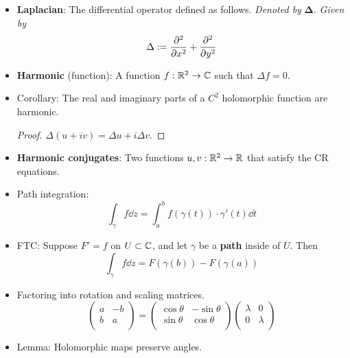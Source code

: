 \documentclass[../notes.tex]{subfiles}
\begin{document}
\begin{itemize}
\begin{equation*}
    \end{equation*}
    \item \textbf{Laplacian}: The differential operator defined as follows. \emph{Denoted by} $\bm{\Delta}$. \emph{Given by}
    \begin{equation*}
        \Delta := \pdv[2]{x}+\pdv[2]{y}
    \end{equation*}
    \item \textbf{Harmonic} (function): A function $f:\mathbb{R}^2\to\mathbb{C}$ such that $\Delta f=0$.
    \item Corollary: The real and imaginary parts of a $C^2$ holomorphic function are harmonic.
    \begin{proof}
        $\Delta(u+iv)=\Delta u+i\Delta v$.
    \end{proof}
    \item \textbf{Harmonic conjugates}: Two functions $u,v:\mathbb{R}^2\to\mathbb{R}$ that satisfy the CR equations.
    \item Path integration:
    \begin{equation*}
        \int_\gamma f\dd{z} = \int_a^bf(\gamma(t))\cdot\gamma'(t)\dd{t}
    \end{equation*}
    \item FTC: Suppose $F'=f$ on $U\subset\mathbb{C}$, and let $\gamma$ be a \textbf{path} inside of $U$. Then
    \begin{equation*}
        \int_\gamma f\dd{z} = F(\gamma(b))-F(\gamma(a))
    \end{equation*}
    \item Factoring into rotation and scaling matrices.
    \begin{equation*}
        \begin{pmatrix}
            a & -b\\
            b & a\\
        \end{pmatrix}
        =
        \begin{pmatrix}
            \cos\theta & -\sin\theta\\
            \sin\theta & \cos\theta\\
        \end{pmatrix}
        \begin{pmatrix}
            \lambda & 0\\
            0 & \lambda\\
        \end{pmatrix}
        \tag{$\lambda,\theta\in\R$}
    \end{equation*}
    \item Lemma: Holomorphic maps preserve angles.

\end{itemize}
\end{document}
